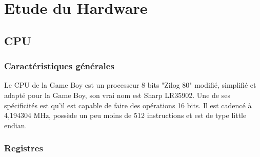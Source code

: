 \documentclass{report}
\begin{document}
\chapter{Etude du Hardware}
\section{CPU}
\subsection{Caractéristiques générales}
Le CPU de la Game Boy est un processeur 8 bits "Zilog 80" modifié, simplifié et adapté pour la Game Boy, son vrai nom est Sharp LR35902.
Une de ses spécificités est qu'il est capable de faire des opérations 16 bits.
Il est cadencé à 4,194304 MHz, possède un peu moins de 512 instructions et est de type little endian.
\subsection{Registres}
\end{document}
